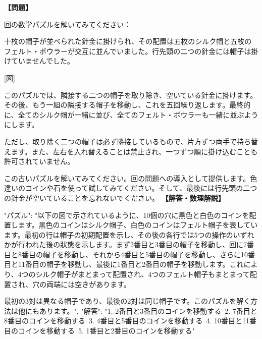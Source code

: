 \documentclass[10pt,a4paper,oneside,openany]{ltjsbook}
\begin{document}
\begin{tcolorbox}[colback=softblue,colframe=primaryblue,title=\textbf{第 236 問：THE HAT PUZZLE.},arc=2mm,boxrule=1pt,breakable]
\textbf{【問題】}\par\vspace{0.3em}
回の数学パズルを解いてみてください：

十枚の帽子が並べられた針金に掛けられ、その配置は五枚のシルク帽と五枚のフェルト・ボウラーが交互に並んでいました。行先頭の二つの針金には帽子は掛けていませんでした。

[図]

このパズルでは、隣接する二つの帽子を取り除き、空いている針金に掛けます。その後、もう一組の隣接する帽子を移動し、これを五回繰り返します。最終的に、全てのシルク帽が一緒に並び、全てのフェルト・ボウラーも一緒に並ぶようにします。

ただし、取り除く二つの帽子は必ず隣接しているもので、片方ずつ両手で持ち替えます。また、左右を入れ替えることは禁止され、一つずつ順に掛け込むことも許可されていません。

この古いパズルを解いてみてください。回の問題への導入として提供します。色違いのコインや石を使って試してみてください。そして、最後には行先頭の二つの針金が空いていることを忘れないでください。
\tcblower
\textbf{【解答・数理解説】}\par\vspace{0.3em}
{
    "パズル": "以下の図で示されているように、10個の穴に黒色と白色のコインを配置します。黒色のコインはシルク帽子、白色のコインはフェルト帽子を表しています。最初の行は帽子の初期配置を示し、その後の各行では5つの操作のいずれかが行われた後の狀態を示します。まず2番目と3番目の帽子を移動し、回に7番目と8番目の帽子を移動し、それから4番目と5番目の帽子を移動し、さらに10番目と11番目の帽子を移動し、最後に1番目と2番目の帽子を移動します。これにより、4つのシルク帽子がまとまって配置され、4つのフェルト帽子もまとまって配置され、穴の両端には空きがあります。

最初の3対は異なる帽子であり、最後の2対は同じ帽子です。このパズルを解く方法は他にもあります。",
    "解答": "1. 2番目と3番目のコインを移動する\
2. 7番目と8番目のコインを移動する\
3. 4番目と5番目のコインを移動する\
4. 10番目と11番目のコインを移動する\
5. 1番目と2番目のコインを移動する"
}
\end{tcolorbox}
\end{document}
